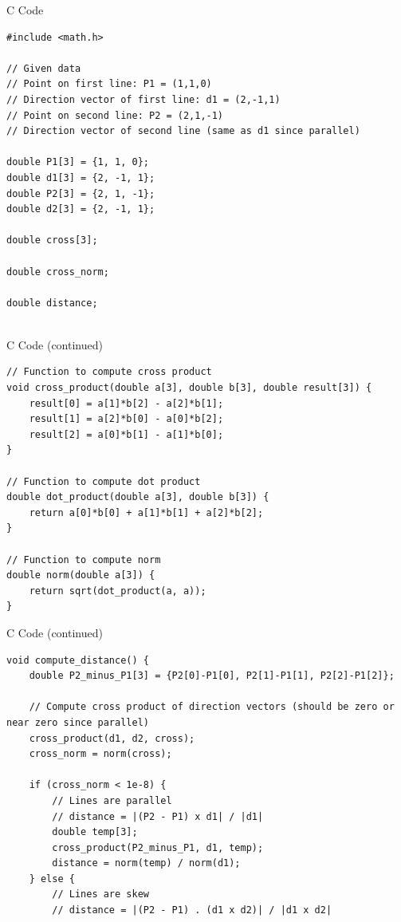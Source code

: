 \documentclass{beamer}
\begin{document}
\begin{frame}[fragile]{C Code}
\begin{lstlisting}
#include <math.h>

// Given data
// Point on first line: P1 = (1,1,0)
// Direction vector of first line: d1 = (2,-1,1)
// Point on second line: P2 = (2,1,-1)
// Direction vector of second line (same as d1 since parallel)

double P1[3] = {1, 1, 0};
double d1[3] = {2, -1, 1};
double P2[3] = {2, 1, -1};
double d2[3] = {2, -1, 1};

double cross[3];

double cross_norm;

double distance;


\end{lstlisting}
\end{frame}

\begin{frame}[fragile]{C Code (continued)}
\begin{lstlisting}
// Function to compute cross product
void cross_product(double a[3], double b[3], double result[3]) {
    result[0] = a[1]*b[2] - a[2]*b[1];
    result[1] = a[2]*b[0] - a[0]*b[2];
    result[2] = a[0]*b[1] - a[1]*b[0];
}

// Function to compute dot product
double dot_product(double a[3], double b[3]) {
    return a[0]*b[0] + a[1]*b[1] + a[2]*b[2];
}

// Function to compute norm
double norm(double a[3]) {
    return sqrt(dot_product(a, a));
}

\end{lstlisting}
\end{frame}

\begin{frame}[fragile]{C Code (continued)}
\begin{lstlisting}
void compute_distance() {
    double P2_minus_P1[3] = {P2[0]-P1[0], P2[1]-P1[1], P2[2]-P1[2]};
    
    // Compute cross product of direction vectors (should be zero or near zero since parallel)
    cross_product(d1, d2, cross);
    cross_norm = norm(cross);

    if (cross_norm < 1e-8) {
        // Lines are parallel
        // distance = |(P2 - P1) x d1| / |d1|
        double temp[3];
        cross_product(P2_minus_P1, d1, temp);
        distance = norm(temp) / norm(d1);
    } else {
        // Lines are skew
        // distance = |(P2 - P1) . (d1 x d2)| / |d1 x d2|

\end{lstlisting}
\end{frame}
\end{document}
